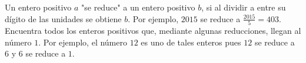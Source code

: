 Un entero positivo $a$ "se reduce" a un entero positivo $b$, si al dividir a entre su dígito de las unidades se obtiene $b$. Por ejemplo, $2015$ se reduce a $\frac{2015}{5}=403$. Encuentra todos los enteros positivos que, mediante algunas reducciones, llegan al número $1$. Por ejemplo, el número $12$ es uno de tales enteros pues $12$ se reduce a $6$ y $6$ se reduce a $1$.